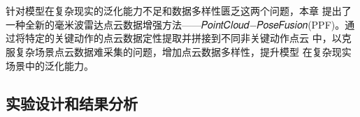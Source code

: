 \chapter{}
针对模型在复杂现实的泛化能力不足和数据多样性匮乏这两个问题，本章
提出了一种全新的毫米波雷达点云数据增强方法——𝑃𝑜𝑖𝑛𝑡𝐶𝑙𝑜𝑢𝑑−𝑃𝑜𝑠𝑒𝐹𝑢𝑠𝑖𝑜𝑛(PPF)。通过将特定的关键动作的点云数据定性提取并拼接到不同非关键动作点云
中，以克服复杂场景点云数据难采集的问题，增加点云数据多样性，提升模型
在复杂现实场景中的泛化能力。

\section{实验设计和结果分析}


